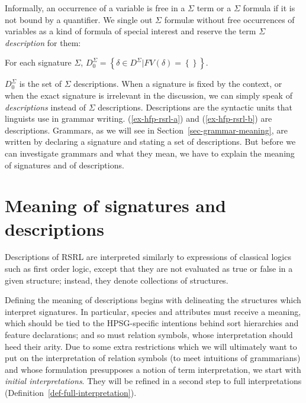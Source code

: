 \documentclass[output=paper
 	        ,biblatex
                ,babelshorthands
                ,newtxmath
                ,draftmode
                ,colorlinks, citecolor=brown
]{langscibook}
\begin{document}
{Informally, an occurrence of a variable is free in a $\Sigma$ term or a
$\Sigma$ formula if it is not bound by a quantifier. We single out
$\Sigma$ formulæ without free occurrences of variables as a kind of formula
of special interest and reserve the term $\Sigma$ \emph{description} for them:

\begin{mydef}
  For each signature $\Sigma$,
  $D_0^{\Sigma}=\left\{\delta\in D^{\Sigma} | FV(\delta)=\left\{\right\}\right\}$.
\end{mydef}

$D_0^{\Sigma}$ is the set of $\Sigma$ descriptions.
When a signature is fixed by the context, or when the exact signature is
irrelevant in the discussion, we can simply speak of \emph{descriptions}
instead of $\Sigma$ descriptions. Descriptions are the syntactic units
that linguists use in grammar writing. (\ref{ex-hfp-rsrl-a}) and (\ref{ex-hfp-rsrl-b}) are descriptions. Grammars, as we will see in
Section~\ref{sec-grammar-meaning}, are written by declaring a signature
and stating a set of descriptions. But before we can investigate grammars and
what they mean, we
have to explain the meaning of signatures and of descriptions.


  
\section{Meaning of signatures and descriptions}
\label{sec-meaning}

Descriptions of RSRL are interpreted similarly to expressions of
classical logics such as first order logic, except that they are not
evaluated as true or false in a given structure; instead, they denote
collections of structures.

Defining the meaning of descriptions begins with delineating the
structures which interpret signatures. In particular, species and
attributes must receive a meaning, which should be tied to the
HPSG-specific intentions behind sort hierarchies and feature
declarations; and so must relation symbols, whose interpretation
should heed their arity. Due to some extra restrictions which we will
ultimately want to put on the interpretation of relation symbols (to meet
intuitions of grammarians) and whose
formulation presupposes a notion of term interpretation, we start with
\emph{initial interpretations}. They will be refined in a second
step to full interpretations (Definition~\ref{def-full-interpretation}).

}
\end{document}
